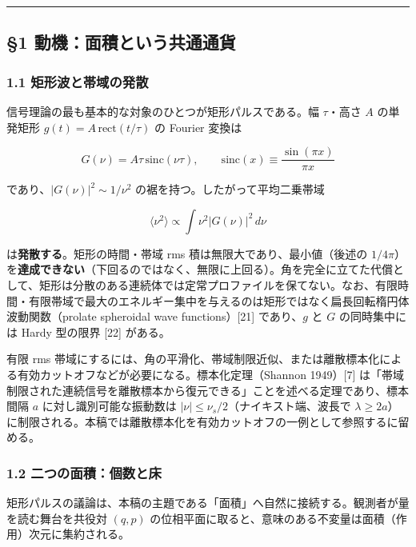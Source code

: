 \documentclass[
]{ltjsarticle}
\begin{document}
\begin{center}\rule{0.5\linewidth}{0.5pt}\end{center}

\subsection{§1
動機：面積という共通通貨}\label{ux52d5ux6a5fux9762ux7a4dux3068ux3044ux3046ux5171ux901aux901aux8ca8}

\subsubsection{1.1
矩形波と帯域の発散}\label{ux77e9ux5f62ux6ce2ux3068ux5e2fux57dfux306eux767aux6563}

信号理論の最も基本的な対象のひとつが矩形パルスである。幅 \(\tau\)・高さ
\(A\) の単発矩形 \(g(t)=A\,\mathrm{rect}(t/\tau)\) の Fourier 変換は

\[G(\nu)=A\tau\,\mathrm{sinc}(\nu\tau),\qquad \mathrm{sinc}(x)\equiv\frac{\sin(\pi x)}{\pi x}\]

であり、\(|G(\nu)|^2\sim 1/\nu^2\) の裾を持つ。したがって平均二乗帯域

\[\langle\nu^2\rangle\propto\int \nu^2|G(\nu)|^2\,d\nu\]

は\textbf{発散する}。矩形の時間・帯域 rms
積は無限大であり、最小値（後述の
\(1/4\pi\)）を\textbf{達成できない}（下回るのではなく、無限に上回る）。角を完全に立てた代償として、矩形は分散のある連続体では定常プロファイルを保てない。なお、有限時間・有限帯域で最大のエネルギー集中を与えるのは矩形ではなく扁長回転楕円体波動関数（prolate
spheroidal wave functions）{[}21{]} であり、\(g\) と \(G\)
の同時集中には Hardy 型の限界 {[}22{]} がある。

有限 rms
帯域にするには、角の平滑化、帯域制限近似、または離散標本化による有効カットオフなどが必要になる。標本化定理（Shannon
1949）{[}7{]}
は「帯域制限された連続信号を離散標本から復元できる」ことを述べる定理であり、標本間隔
\(a\) に対し識別可能な振動数は \(|\nu|\le\nu_s/2\)（ナイキスト端、波長で
\(\lambda\ge 2a\)）に制限される。本稿では離散標本化を有効カットオフの一例として参照するに留める。

\subsubsection{1.2
二つの面積：個数と床}\label{ux4e8cux3064ux306eux9762ux7a4dux500bux6570ux3068ux5e8a}

矩形パルスの議論は、本稿の主題である「面積」へ自然に接続する。観測者が量を読む舞台を共役対
\((q,p)\)
の位相平面に取ると、意味のある不変量は面積（作用）次元に集約される。
\end{document}
